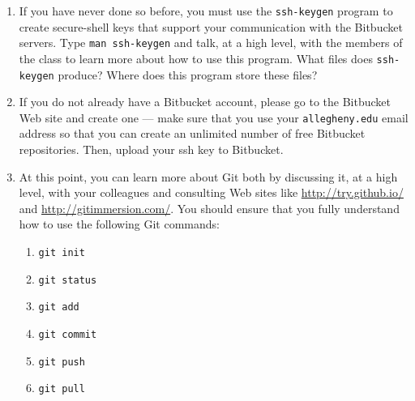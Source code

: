 \begin{enumerate}
	
  \item If you have never done so before, you must use the {\tt ssh-keygen} program to create secure-shell keys that
    support your communication with the Bitbucket servers.  Type {\tt man ssh-keygen} and talk, at a high level, with
    the members of the class to learn more about how to use this program.  What files does {\tt ssh-keygen} produce?
    Where does this program store these files?

  \item If you do not already have a Bitbucket account, please go to the Bitbucket Web site and create one --- 
    make sure that you use your {\tt allegheny.edu} email address so that you can create an unlimited number of free
    Bitbucket repositories. Then, upload your ssh key to Bitbucket.

    \item At this point, you can learn more about Git both by discussing it, at a high level, with your colleagues and
      consulting Web sites like \url{http://try.github.io/} and \url{http://gitimmersion.com/}.  You should
      ensure that you fully understand how to use the following Git commands:

      \begin{enumerate} 
        \item {\tt git init}
        \item {\tt git status}
        \item {\tt git add} 
        \item {\tt git commit}
        \item {\tt git push}
        \item {\tt git pull} 
      \end{enumerate}



\end{enumerate}
